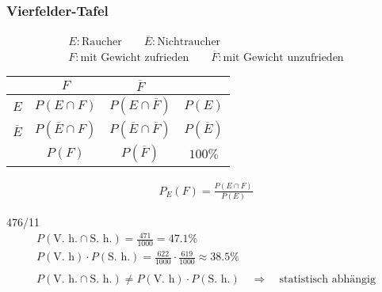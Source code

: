 \subsubsection{Vierfelder-Tafel}
\begin{gather*}
  E \colon \text{Raucher} \qquad \overline{E} \colon \text{Nichtraucher} \\
  F \colon \text{mit Gewicht zufrieden} \qquad \overline{F} \colon \text{mit Gewicht unzufrieden}
\end{gather*}
\begin{tabular}{c|c|c|c}
  & $F$ & $\overline{F}$ & \\ \hline
  $E$ & $P(E \cap F)$ & $P(E \cap \overline{F})$ & $P(E)$ \\ \hline
  $\overline{E}$ & $P(\overline{E} \cap F)$ & $P(\overline{E} \cap \overline{F})$ & $P(\overline{E})$ \\ \hline
  & $P(F)$ & $P(\overline{F})$ & $100\%$
\end{tabular}
\begin{gather*}
  P_E(F) = \frac{P(E \cap F)}{P(E)}
\end{gather*}
\begin{exercise}{476/11}
  \begin{gather*}
    P(\text{V. h.} \cap \text{S. h.}) = \frac{471}{1000} = 47.1\% \\
    P(\text{V. h}) \cdot P(\text{S. h.}) = \frac{622}{1000} \cdot \frac{619}{1000} \approx 38.5\% \\\\
    P(\text{V. h.} \cap \text{S. h.}) \neq P(\text{V. h}) \cdot P(\text{S. h.}) \quad\Rightarrow\quad \text{statistisch abhängig}
  \end{gather*}
\end{exercise}
